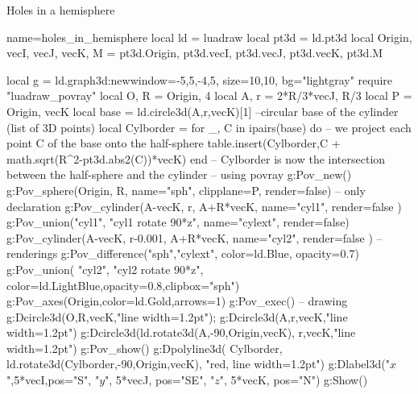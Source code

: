 \begin{demo}{Holes in a hemisphere}
\begin{luadraw}{name=holes_in_hemisphere}
local ld = luadraw
local pt3d = ld.pt3d
local Origin, vecI, vecJ, vecK, M = pt3d.Origin, pt3d.vecI, pt3d.vecJ, pt3d.vecK, pt3d.M

local g = ld.graph3d:new{window={-5,5,-4,5}, size={10,10}, bg="lightgray"}
require "luadraw_povray"
local O, R = Origin, 4
local A, r = 2*R/3*vecJ, R/3
local P = {Origin, vecK}
local base = ld.circle3d(A,r,vecK)[1] --circular base of the cylinder (list of 3D points)
local Cylborder = {}
for _, C in ipairs(base) do -- we project each point C of the base onto the half-sphere
    table.insert(Cylborder,C + math.sqrt(R^2-pt3d.abs2(C))*vecK)
end -- Cylborder is now the intersection between the half-sphere and the cylinder
-- using povray 
g:Pov_new()
g:Pov_sphere(Origin, R, {name="sph", clipplane=P, render=false}) -- only declaration
g:Pov_cylinder(A-vecK, r, A+R*vecK, {name="cyl1", render=false })
g:Pov_union({"cyl1", "cyl1 rotate 90*z"}, {name="cylext", render=false})
g:Pov_cylinder(A-vecK, r-0.001, A+R*vecK, {name="cyl2", render=false }) 
-- renderings
g:Pov_difference({"sph","cylext"}, {color=ld.Blue, opacity=0.7})
g:Pov_union( {"cyl2", "cyl2 rotate 90*z"}, {color=ld.LightBlue,opacity=0.8,clipbox="sph"})
g:Pov_axes(Origin,{color=ld.Gold,arrows=1})
g:Pov_exec()
-- drawing
g:Dcircle3d(O,R,vecK,"line width=1.2pt"); g:Dcircle3d(A,r,vecK,"line width=1.2pt")
g:Dcircle3d(ld.rotate3d(A,-90,{Origin,vecK}), r,vecK,"line width=1.2pt")
g:Pov_show()
g:Dpolyline3d( {Cylborder, ld.rotate3d(Cylborder,-90,{Origin,vecK})}, "red, line width=1.2pt")
g:Dlabel3d("$x$",5*vecI,{pos="S"}, "$y$", 5*vecJ, {pos="SE"}, "$z$", 5*vecK, {pos="N"})
g:Show()
\end{luadraw}
\end{demo}
